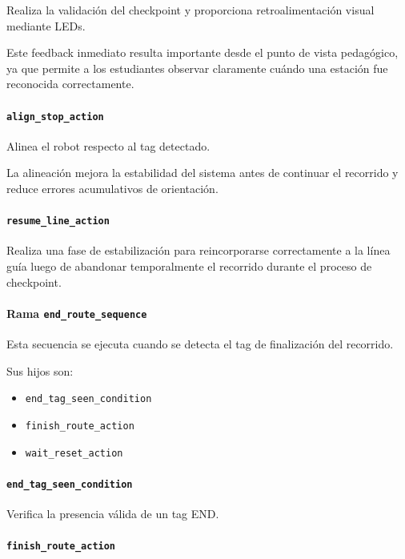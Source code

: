 \documentclass{prgrado}
\begin{document}
Realiza la validación del checkpoint y proporciona retroalimentación visual mediante LEDs.

Este feedback inmediato resulta importante desde el punto de vista pedagógico, ya que permite a los estudiantes observar claramente cuándo una estación fue reconocida correctamente.

\paragraph{\texttt{align\_stop\_action}}

Alinea el robot respecto al tag detectado.

La alineación mejora la estabilidad del sistema antes de continuar el recorrido y reduce errores acumulativos de orientación.

\paragraph{\texttt{resume\_line\_action}}

Realiza una fase de estabilización para reincorporarse correctamente a la línea guía luego de abandonar temporalmente el recorrido durante el proceso de checkpoint.

\paragraph{Rama \texttt{end\_route\_sequence}}

Esta secuencia se ejecuta cuando se detecta el tag de finalización del recorrido.

Sus hijos son:

\begin{itemize}
    \item \texttt{end\_tag\_seen\_condition}
    \item \texttt{finish\_route\_action}
    \item \texttt{wait\_reset\_action}
\end{itemize}

\paragraph{\texttt{end\_tag\_seen\_condition}}

Verifica la presencia válida de un tag END.

\paragraph{\texttt{finish\_route\_action}}
\end{document}
